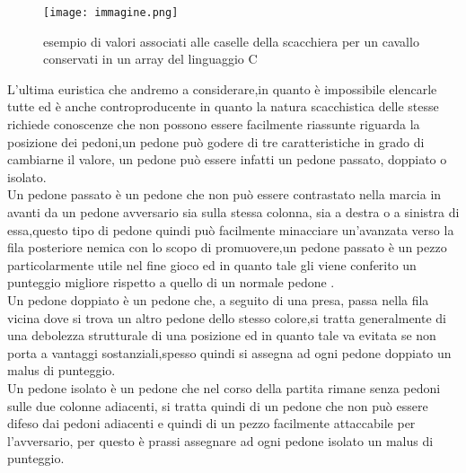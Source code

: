 \begin{figure}
    \centering
    \texttt{[image: immagine.png]}
    \caption{esempio di valori associati alle caselle della scacchiera per un cavallo conservati in un array del linguaggio C}
\end{figure}

L'ultima euristica che andremo a considerare,in quanto è impossibile elencarle tutte ed è anche controproducente in quanto la natura scacchistica delle stesse richiede conoscenze che non possono essere facilmente riassunte
riguarda la posizione dei pedoni,un pedone può godere di tre caratteristiche in grado di cambiarne il valore, un pedone può essere infatti  un pedone passato, doppiato o isolato.\\
Un pedone passato è un pedone che non può essere contrastato nella marcia in avanti da un pedone avversario sia sulla stessa colonna, sia a destra o a sinistra di essa,questo tipo di pedone quindi può facilmente 
minacciare un'avanzata verso la fila posteriore nemica con lo scopo di promuovere,un pedone passato è un pezzo particolarmente utile nel fine gioco ed in quanto tale gli viene conferito un punteggio migliore
rispetto a quello di un normale pedone .\\ 
Un pedone doppiato è un pedone che, a seguito di una presa, passa nella fila vicina dove si trova un altro pedone dello stesso colore,si tratta generalmente di una debolezza strutturale di una posizione 
ed in quanto tale va evitata se non porta a vantaggi sostanziali,spesso quindi si assegna ad ogni pedone doppiato un malus di punteggio.\\
Un pedone isolato è un pedone che nel corso della partita rimane senza pedoni sulle due colonne adiacenti, si tratta quindi di un pedone che non può essere difeso dai pedoni adiacenti e quindi di un pezzo
facilmente attaccabile per l'avversario, per questo è prassi assegnare ad ogni pedone isolato un malus di punteggio.



